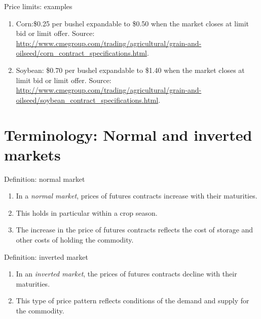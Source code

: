 \documentclass[table,xcolor=pdftex,dvipsnames]{beamer}\usepackage[]{graphicx}\usepackage[]{color}
\begin{document}
\begin{frame}{Price limits: examples}
\begin{enumerate}[label=\textbullet]
      \item Corn:\$0.25 per bushel expandable to \$0.50 when the market closes at limit bid or limit offer. Source: \url{http://www.cmegroup.com/trading/agricultural/grain-and-oilseed/corn_contract_specifications.html}.
      \item Soybean: \$0.70 per bushel expandable to \$1.40 when the market closes at limit bid or limit offer. Source: \url{http://www.cmegroup.com/trading/agricultural/grain-and-oilseed/soybean_contract_specifications.html}.
\end{enumerate}
\end{frame}


\section{Terminology: Normal and inverted markets}

\begin{frame}{Definition: normal market}
\begin{enumerate}[label=\textbullet]
      \item In a \emph{normal market}, prices of futures contracts increase with their maturities.
      \item This holds in particular within a crop season.
      \item The increase in the price of futures contracts reflects the cost of storage and other costs of holding the commodity.
\end{enumerate}
\end{frame}


\begin{frame}{Definition: inverted market}
\begin{enumerate}[label=\textbullet]
      \item In an \emph{inverted market}, the prices of futures contracts decline with their maturities.
      \item This type of price pattern reflects conditions of the demand and supply for the commodity.
\end{enumerate}
\end{frame}
\end{document}
